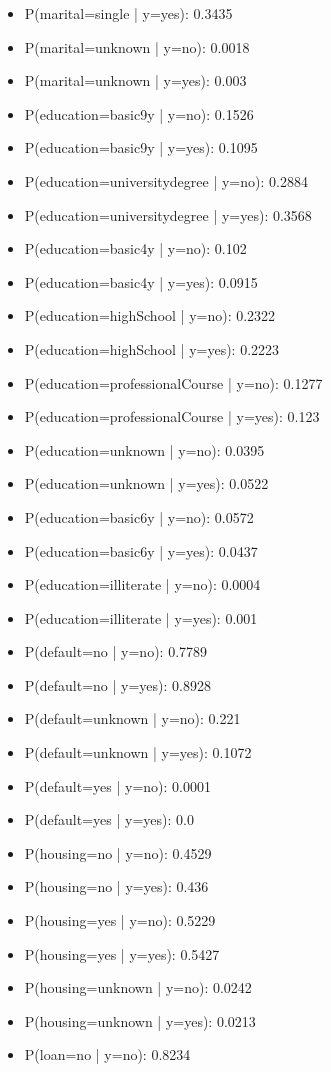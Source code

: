 \documentclass[letterpaper, 10 pt, conference]{ieeeconf}
\begin{document}
\begin{itemize}
	\item P(marital=single | y=yes): 0.3435
	\item P(marital=unknown | y=no): 0.0018
	\item P(marital=unknown | y=yes): 0.003
	\item P(education=basic9y | y=no): 0.1526
	\item P(education=basic9y | y=yes): 0.1095
	\item P(education=universitydegree | y=no): 0.2884
	\item P(education=universitydegree | y=yes): 0.3568
	\item P(education=basic4y | y=no): 0.102
	\item P(education=basic4y | y=yes): 0.0915
	\item P(education=highSchool | y=no): 0.2322
	\item P(education=highSchool | y=yes): 0.2223
	\item P(education=professionalCourse | y=no): 0.1277
	\item P(education=professionalCourse | y=yes): 0.123
	\item P(education=unknown | y=no): 0.0395
	\item P(education=unknown | y=yes): 0.0522
	\item P(education=basic6y | y=no): 0.0572
	\item P(education=basic6y | y=yes): 0.0437
	\item P(education=illiterate | y=no): 0.0004
	\item P(education=illiterate | y=yes): 0.001
	\item P(default=no | y=no): 0.7789
	\item P(default=no | y=yes): 0.8928
	\item P(default=unknown | y=no): 0.221
	\item P(default=unknown | y=yes): 0.1072
	\item P(default=yes | y=no): 0.0001
	\item P(default=yes | y=yes): 0.0
	\item P(housing=no | y=no): 0.4529
	\item P(housing=no | y=yes): 0.436
	\item P(housing=yes | y=no): 0.5229
	\item P(housing=yes | y=yes): 0.5427
	\item P(housing=unknown | y=no): 0.0242
	\item P(housing=unknown | y=yes): 0.0213
	\item P(loan=no | y=no): 0.8234

\end{itemize}
\end{document}

